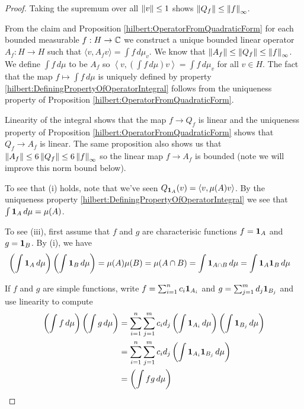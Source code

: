 \begin{proof}
Taking the supremum over all $\left \lVert v \right \rVert \leq 1$ shows $\left \lVert Q_f \right \rVert \leq \left \lVert f \right \rVert_\infty$.

From the claim and Proposition  \ref{hilbert:OperatorFromQuadraticForm} for each bounded measurable $f : H \to \mathbb{C}$ we construct a unique bounded linear operator $A_f : H \to H$ such that
$\langle v, A_f v \rangle = \int f \, d \mu_v$.  We know that
$\left \lVert A_f \right \rVert \leq \left \lVert Q_f \right \rVert \leq \left \lVert f \right \rVert_\infty$.  We define $\int f
\, d\mu$ to be $A_f$ so $\left \langle v, \left(\int f \, d\mu \right)
  v \right \rangle = \int f \, d\mu_v$ for all $v \in H$.  The fact
that the map $f \mapsto \int f \, d\mu$ is uniquely defined by
property \eqref{hilbert:DefiningPropertyOfOperatorIntegral} follows
from the uniqueness property of Proposition
\ref{hilbert:OperatorFromQuadraticForm}.

Linearity of the integral shows that the map $f \to Q_f$ is linear and
the uniqueness property of Proposition
\ref{hilbert:OperatorFromQuadraticForm} shows that $Q_f \to A_f$ is
linear.  The same proposition also
shows us that $\left \lVert A_f \right \rVert \leq 6 \left \lVert Q_f \right \rVert \leq 6 \left \lVert f \right \rVert_\infty$ so 
the linear map $f \to A_f$ is bounded (note we will improve this norm
bound below).

To see that (i) holds, note that we've seen $Q_{\textbf{1}_{A}}(v)
= \langle v, \mu(A) v \rangle$.   By the uniqueness property
\eqref{hilbert:DefiningPropertyOfOperatorIntegral}  we see that $\int
\textbf{1}_{A} \, d\mu = \mu(A)$.  

To see (iii), first assume that $f$ and $g$ are characterisic
functions $f=\textbf{1}_{A}$ and $g=\textbf{1}_{B}$.  
By (i), we have
\begin{align*}
 \left( \int \textbf{1}_{A} \, d\mu \right)  \left( \int
  \textbf{1}_{B} \, d\mu \right)
  &= \mu(A) \mu(B) = \mu(A \cap B) = \int \textbf{1}_{A \cap B} \,  d\mu
    =  \int \textbf{1}_{A} \textbf{1}_{B} \,  d\mu
\end{align*}

If $f$ and $g$ are simple functions, write $f = \sum_{i=1}^n c_i
\textbf{1}_{A_i}$ and $g = \sum_{j=1}^m d_j \textbf{1}_{B_j}$
and use linearity to compute
\begin{align*}
  \left( \int f \, d\mu \right)   \left( \int g \, d\mu \right)
  &= \sum_{i=1}^n \sum_{j=1}^m c_i d_j \left( \int
    \textbf{1}_{A_i} \, d\mu \right)   \left( \int
    \textbf{1}_{B_j} \, d\mu \right) \\
  &= \sum_{i=1}^n \sum_{j=1}^m c_i d_j   \left( \int
    \textbf{1}_{A_i} \textbf{1}_{B_j} \, d\mu \right) \\
  &= \left( \int f g \, d\mu \right)
\end{align*}


\end{proof}
